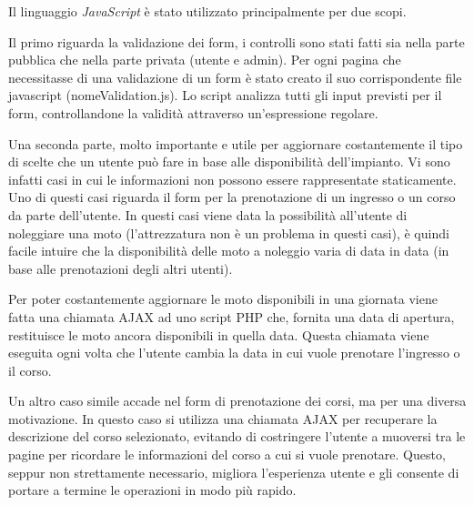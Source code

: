 Il linguaggio \textit{JavaScript} è stato utilizzato principalmente per due scopi.

Il primo riguarda la validazione dei form, i controlli sono stati fatti sia nella parte pubblica che nella parte privata (utente e admin). Per ogni pagina che necessitasse di una validazione di un form è stato creato il suo corrispondente file javascript (nomeValidation.js). Lo script analizza tutti gli input previsti per il form, controllandone la validità attraverso un'espressione regolare.
    
Una seconda parte, molto importante e utile per aggiornare costantemente il tipo di scelte che un utente può fare in base alle disponibilità dell'impianto. Vi sono infatti casi in cui le informazioni non possono essere rappresentate staticamente. Uno di questi casi riguarda il form per la prenotazione di un ingresso o un corso da parte dell'utente. In questi casi viene data la possibilità all'utente di noleggiare una moto (l'attrezzatura non è un problema in questi casi), è quindi facile intuire che la disponibilità delle moto a noleggio varia di data in data (in base alle prenotazioni degli altri utenti).

Per poter costantemente aggiornare le moto disponibili in una giornata viene fatta una chiamata AJAX ad uno script PHP che, fornita una data di apertura, restituisce le moto ancora disponibili in quella data. Questa chiamata viene eseguita ogni volta che l'utente cambia la data in cui vuole prenotare l'ingresso o il corso.

Un altro caso simile accade nel form di prenotazione dei corsi, ma per una diversa motivazione. In questo caso si utilizza una chiamata AJAX per recuperare la descrizione del corso selezionato, evitando di costringere l'utente a muoversi tra le pagine per ricordare le informazioni del corso a cui si vuole prenotare. Questo, seppur non strettamente necessario, migliora l'esperienza utente e gli consente di portare a termine le operazioni in modo più rapido.
 